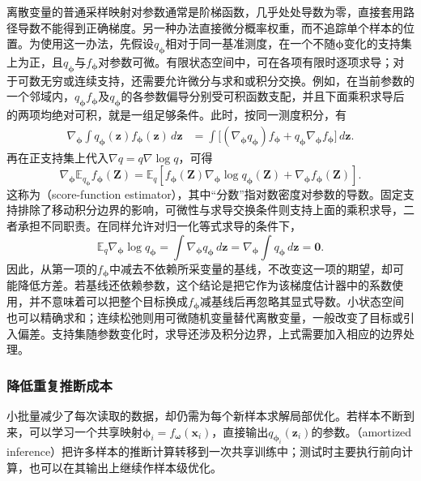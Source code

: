 离散变量的普通采样映射对参数通常是阶梯函数，几乎处处导数为零，直接套用路径导数不能得到正确梯度。另一种办法直接微分概率权重，而不追踪单个样本的位置。为使用这一办法，先假设$q_{\bm\phi}$相对于同一基准测度，在一个不随$\bm\phi$变化的支持集上为正，且$q_{\bm\phi}$与$f_{\bm\phi}$对参数可微。有限状态空间中，可在各项有限时逐项求导；对于可数无穷或连续支持，还需要允许微分与求和或积分交换。例如，在当前参数的一个邻域内，$q_{\bm\phi}f_{\bm\phi}$及$q_{\bm\phi}$的各参数偏导分别受可积函数支配，并且下面乘积求导后的两项均绝对可积，就是一组足够条件。此时，按同一测度积分，有
\[
  \begin{aligned}
    \nabla_{\bm\phi}\int q_{\bm\phi}(\bm z)f_{\bm\phi}(\bm z)\,d\bm z
      &=\int\big[(\nabla_{\bm\phi}q_{\bm\phi})f_{\bm\phi}
                   +q_{\bm\phi}\nabla_{\bm\phi}f_{\bm\phi}\big]\,d\bm z.
  \end{aligned}
\]
再在正支持集上代入$\nabla q=q\nabla\log q$，可得
\begin{equation}
  \nabla_{\bm{\phi}}\mathbb E_{q_{\bm{\phi}}}f_{\bm{\phi}}(\bm Z)
    =\mathbb E_q\!\left[
       f_{\bm{\phi}}(\bm Z)\nabla_{\bm{\phi}}\log q_{\bm{\phi}}(\bm Z)
       +\nabla_{\bm{\phi}}f_{\bm{\phi}}(\bm Z)\right].
  \label{eq:pgm-variational-score-function}
\end{equation}
这称为（score-function estimator），其中“分数”指对数密度对参数的导数。固定支持排除了移动积分边界的影响，可微性与求导交换条件则支持上面的乘积求导，二者承担不同职责。在同样允许对归一化等式求导的条件下，
\[
  \mathbb E_q\nabla_{\bm\phi}\log q_{\bm\phi}
    =\int\nabla_{\bm\phi}q_{\bm\phi}\,d\bm z
    =\nabla_{\bm\phi}\int q_{\bm\phi}\,d\bm z=\bm0.
\]
因此，从第一项的$f_{\bm\phi}$中减去不依赖所采变量的基线，不改变这一项的期望，却可能降低方差。若基线还依赖参数，这个结论是把它作为该梯度估计器中的系数使用，并不意味着可以把整个目标换成$f_{\bm\phi}$减基线后再忽略其显式导数。小状态空间也可以精确求和；连续松弛则用可微随机变量替代离散变量，一般改变了目标或引入偏差。支持集随参数变化时，求导还涉及积分边界，上式需要加入相应的边界处理。

\subsubsection{降低重复推断成本}

\label{sec:pgm-variational-amortized}

小批量减少了每次读取的数据，却仍需为每个新样本求解局部优化。若样本不断到来，可以学习一个共享映射$\bm{\phi}_i=f_{\bm{\omega}}(\bm x_i)$，直接输出$q_{\bm{\phi}_i}(\bm z_i)$的参数。（amortized inference）把许多样本的推断计算转移到一次共享训练中；测试时主要执行前向计算，也可以在其输出上继续作样本级优化。

